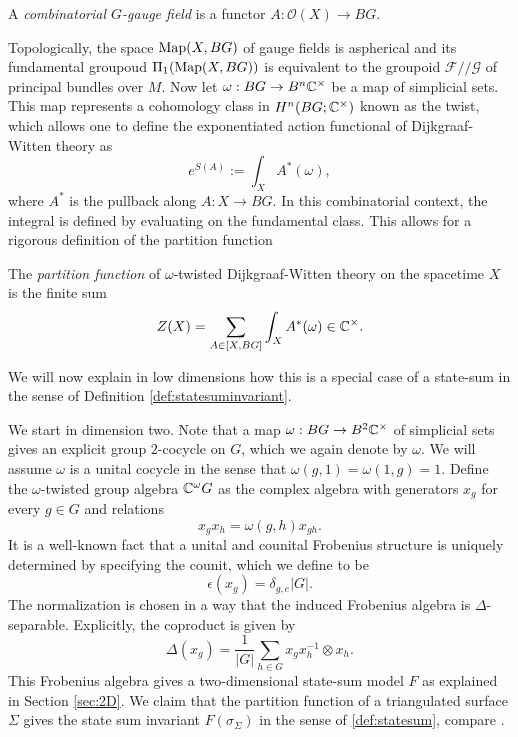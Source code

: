 \begin{definition}
\label{def:DWgaugefield}
    A \emph{combinatorial $G$-gauge field} is a functor $A: \mathcal{O}(X) \to BG$.
\end{definition}

Topologically, the space $\operatorname{Map}(X,BG)$ of gauge fields is aspherical and its fundamental groupoud $\Pi_1(\operatorname{Map}(X,BG))$ is equivalent to the groupoid $\mathcal{F}//\mathcal{G}$ of principal bundles over $M$.
 Now let $\omega: BG \to B^n \mathbb{C}^\times$ be a map of simplicial sets.
 This map represents a cohomology class in $H^n(BG; \mathbb{C}^\times)$ known as the twist, which allows one to define the exponentiated action functional of Dijkgraaf-Witten theory as
\[
e^{S(A)} := \int_X A^*(\omega),
\]
where $A^*$ is the pullback along $A: X \to BG$.
In this combinatorial context, the integral is defined by evaluating on the fundamental class.
This allows for a rigorous definition of the partition function 

\begin{definition}
\label{def:partitionfunctionDW}
The \emph{partition function} of $\omega$-twisted Dijkgraaf-Witten theory on the spacetime $X$ is the finite sum
\[
Z(X) = \sum_{A \in [X,BG]} \int_X A^*(\omega) \in \mathbb{C}^\times.
\]
\end{definition}

We will now explain in low dimensions how this is a special case of a state-sum in the sense of Definition \ref{def:statesuminvariant}.

We start in dimension two.
Note that a map $\omega: BG \to B^2 \mathbb{C}^\times$ of simplicial sets gives an explicit group $2$-cocycle on $G$, which we again denote by $\omega$.
We will assume $\omega$ is a unital cocycle in the sense that $\omega(g,1) = \omega(1,g) = 1$. 
Define the $\omega$-twisted group algebra $\mathbb{C}^\omega G$ as the complex algebra with generators $x_g$ for every $g \in G$ and relations
\[
x_g x_h = \omega(g,h) x_{gh}.
\]
It is a well-known fact that a unital and counital Frobenius structure is uniquely determined by specifying the counit, which we define to be
\[
\epsilon(x_g) = \delta_{g,e} |G|.
\]
The normalization is chosen in a way that the induced Frobenius algebra is $\Delta$-separable.
Explicitly, the coproduct is given by
\[
\Delta(x_g) = \frac{1}{|G|} \sum_{h \in G} x_g x_{h}^{-1} \otimes x_h.
\]
This Frobenius algebra gives a two-dimensional state-sum model $F$ as explained in Section \ref{sec:2D}.
We claim that the partition function of a triangulated surface $\Sigma$ gives the state sum invariant $F(\sigma_\Sigma)$ in the sense of \ref{def:statesum}, compare \cite{oritthesis}. 

